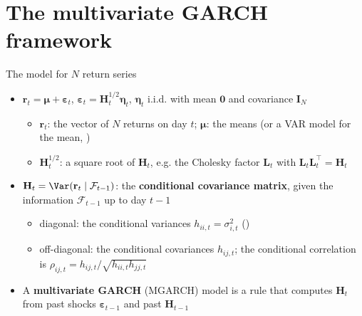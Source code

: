 \section{The multivariate GARCH framework}

\begin{frame}{The model for $N$ return series}
\itemsize{\small}
\begin{itemize}
    \item $\mathbf{r}_t = \boldsymbol{\mu} + \boldsymbol{\varepsilon}_t$, \quad $\boldsymbol{\varepsilon}_t = \mathbf{H}_t^{1/2}\boldsymbol{\eta}_t$, \quad $\boldsymbol{\eta}_t$ i.i.d. with mean $\mathbf{0}$ and covariance $\mathbf{I}_N$
    \begin{itemize}
        \item $\mathbf{r}_t$: the vector of $N$ returns on day $t$; $\boldsymbol{\mu}$: the means (or a VAR model for the mean, )
        \item $\mathbf{H}_t^{1/2}$: a square root of $\mathbf{H}_t$, e.g. the Cholesky factor $\mathbf{L}_t$ with $\mathbf{L}_t\mathbf{L}_t^\top = \mathbf{H}_t$
    \end{itemize}
    \item $\mathbf{H}_t = \Var(\mathbf{r}_t \mid \mathcal{F}_{t-1})$: the \textbf{conditional covariance matrix}, given the information $\mathcal{F}_{t-1}$ up to day $t-1$
    \begin{itemize}
        \item diagonal: the conditional variances $h_{ii,t} = \sigma_{i,t}^2$ ()
        \item off-diagonal: the conditional covariances $h_{ij,t}$; the conditional correlation is $\rho_{ij,t} = h_{ij,t}/\sqrt{h_{ii,t}h_{jj,t}}$
    \end{itemize}
    \item A \textbf{multivariate GARCH} (MGARCH) model is a rule that computes $\mathbf{H}_t$ from past shocks $\boldsymbol{\varepsilon}_{t-1}$ and past $\mathbf{H}_{t-1}$
\end{itemize}
\end{frame}

